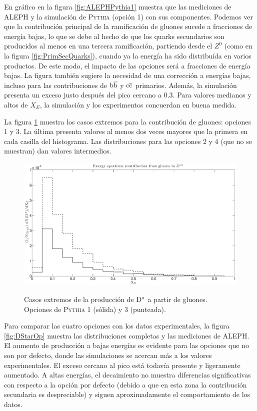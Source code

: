 \documentclass[a4paper,12pt]{article}
\begin{document}
En gráfico en la figura \ref{fig:ALEPHPythia1} muestra que las mediciones de ALEPH y la simulación de \textsc{Pythia} (opción 1) con sus componentes. Podemos ver que la contribución principal de la ramificación de gluones sucede a fracciones de energía bajas, lo que se debe al hecho de que los quarks secundarios son producidos al menos en una tercera ramificación, partiendo desde el $Z^0$ (como en la figura \ref{fig:PrimSecQuarks}), cuando ya la energía ha sido distribuída en varios productos. De este modo, el impacto de las opciones será a fracciones de energía bajas. La figura también sugiere la necesidad de una corrección a energías bajas, incluso para las contribuciones de ${\mathrm b}\overline{\mathrm b}$ y ${\mathrm c}\overline{\mathrm c}$ primarios. Además, la simulación presenta un exceso justo después del pico cercano a $0.3$. Para valores medianos y altos de $X_E$, la simulación y los experimentos concuerdan en buena medida.

La figura \ref{fig:GluonDStar} muestra los casos extremos para la contribución de gluones: opciones 1 y 3. La última presenta valores al menos dos veces mayores que la primera en cada casilla del histograma. Las distribuciones para las opciones 2 y 4 (que no se muestran) dan valores intermedios.

\begin{figure}[h]
\centering
\caption[Contribución de los gluones a la producción de $\D^{*\pm}$ en dos casos extremos.]{Casos extremos de la producción de ${\mathrm D}^{*}$ a partir de gluones. Opciones de \textsc{Pythia} 1 (sólida) y 3 (punteada).}
\includegraphics[width=15cm]{GluonDStarThesis}
\label{fig:GluonDStar}
\end{figure}

Para comparar las cuatro opciones con los datos experimentales, la figura \ref{fig:DStarOp} muestra las distribuciones completas y las mediciones de ALEPH. El aumento de producción a bajas energías es evidente para las opciones que no son por defecto, donde las simulaciones se acercan más a los valores experimentales. El exceso cercano al pico está todavía presente y ligeramente aumentado. A altas energías, el decaimiento no muestra diferencias significativas con respecto a la opción por defecto (debido a que en esta zona la contribución secundaria es despreciable) y siguen aproximadamente el comportamiento de los datos.
\end{document}
